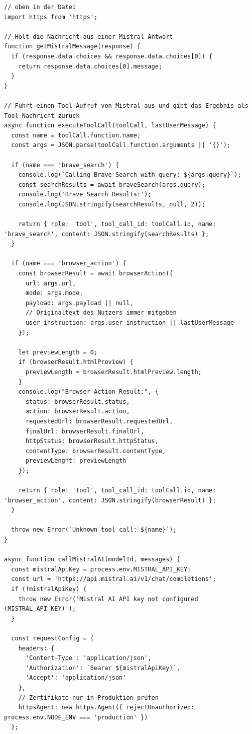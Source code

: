 \begin{lstlisting}
// oben in der Datei
import https from 'https';

// Holt die Nachricht aus einer Mistral-Antwort
function getMistralMessage(response) {
  if (response.data.choices && response.data.choices[0]) {
    return response.data.choices[0].message;
  }
}

// Führt einen Tool-Aufruf von Mistral aus und gibt das Ergebnis als Tool-Nachricht zurück
async function executeToolCall(toolCall, lastUserMessage) {
  const name = toolCall.function.name;
  const args = JSON.parse(toolCall.function.arguments || '{}');

  if (name === 'brave_search') {
    console.log(`Calling Brave Search with query: ${args.query}`);
    const searchResults = await braveSearch(args.query);
    console.log('Brave Search Results:');
    console.log(JSON.stringify(searchResults, null, 2));

    return { role: 'tool', tool_call_id: toolCall.id, name: 'brave_search', content: JSON.stringify(searchResults) };
  }

  if (name === 'browser_action') {
    const browserResult = await browserAction({
      url: args.url,
      mode: args.mode,
      payload: args.payload || null,
      // Originaltext des Nutzers immer mitgeben
      user_instruction: args.user_instruction || lastUserMessage
    });

    let previewLength = 0;
    if (browserResult.htmlPreview) {
      previewLength = browserResult.htmlPreview.length;
    }
    console.log("Browser Action Result:", {
      status: browserResult.status,
      action: browserResult.action,
      requestedUrl: browserResult.requestedUrl,
      finalUrl: browserResult.finalUrl,
      httpStatus: browserResult.httpStatus,
      contentType: browserResult.contentType,
      previewLenght: previewLength
    });

    return { role: 'tool', tool_call_id: toolCall.id, name: 'browser_action', content: JSON.stringify(browserResult) };
  }

  throw new Error(`Unknown tool call: ${name}`);
}

async function callMistralAI(modelId, messages) {
  const mistralApiKey = process.env.MISTRAL_API_KEY;
  const url = 'https://api.mistral.ai/v1/chat/completions';
  if (!mistralApiKey) {
    throw new Error('Mistral AI API key not configured (MISTRAL_API_KEY)');
  }

  const requestConfig = {
    headers: {
      'Content-Type': 'application/json',
      'Authorization': `Bearer ${mistralApiKey}`,
      'Accept': 'application/json'
    },
    // Zertifikate nur in Produktion prüfen
    httpsAgent: new https.Agent({ rejectUnauthorized: process.env.NODE_ENV === 'production' })
  };


\end{lstlisting}
